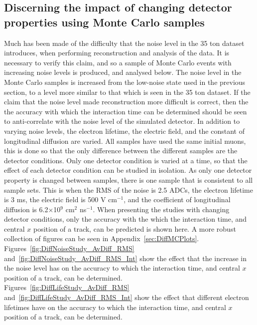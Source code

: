\subsection{Discerning the impact of changing detector properties using Monte Carlo samples} \label{sec:DiffMCStudies}
Much has been made of the difficulty that the noise level in the 35 ton dataset introduces, when performing reconstruction and analysis of the data. It is necessary to verify this claim, and so a sample of Monte Carlo events with increasing noise levels is produced, and analysed below. The noise level in the Monte Carlo samples is increased from the low-noise state used in the previous section, to a level more similar to that which is seen in the 35 ton dataset. If the claim that the noise level made reconstruction more difficult is correct, then the the accuracy with which the interaction time can be determined should be seen to anti-correlate with the noise level of the simulated detector. In addition to varying noise levels, the electron lifetime, the electric field, and the constant of longitudinal diffusion are varied. All samples have used the same initial muons, this is done so that the only difference between the different samples are the detector conditions. Only one detector condition is varied at a time, so that the effect of each detector condition can be studied in isolation. As only one detector property is changed between samples, there is one sample that is consistent to all sample sets. This is when the RMS of the noise is 2.5 ADCs, the electron lifetime is 3 ms, the electric field is 500 V cm$^{-1}$, and the coefficient of longitudinal diffusion is 6.2$\times$10$^9$ cm$^2$ ns$^{-1}$. When presenting the studies with changing detector conditions, only the accuracy with the which the interaction time, and central $x$ position of a track, can be predicted is shown here. A more robust collection of figures can be seen in Appendix~\ref{sec:DiffMCPlots}. \\

Figures~\ref{fig:DiffNoiseStudy_AvDiff_RMS} and~\ref{fig:DiffNoiseStudy_AvDiff_RMS_Int} show the effect that the increase in the noise level has on the accuracy to which the interaction time, and central $x$ position of a track, can be determined. \\

Figures~\ref{fig:DiffLifeStudy_AvDiff_RMS} and~\ref{fig:DiffLifeStudy_AvDiff_RMS_Int} show the effect that different electron lifetimes have on the accuracy to which the interaction time, and central $x$ position of a track, can be determined. \\


